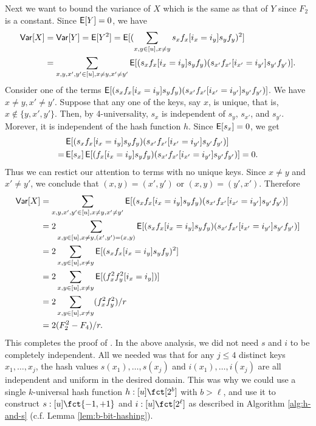 Next we want to bound the variance of $X$ which is the same as
that of $Y$ since $F_2$ is a constant. Since
$\operatorname*{\sf{E}}[Y]=0$, we have
\begin{align*}
{\sf Var}[X]&={\sf Var}[Y]=\operatorname*{\sf{E}}[Y^2]=\operatorname*{\sf{E}}[(\sum_{x,y\in[u],x\neq y}s_x f_x[i_x=i_y]s_y f_y)^2]\\
&=\sum_{x,y,x',y'\in[u],x\neq y,x'\neq y'}\operatorname*{\sf{E}}[(s_x f_x[i_x=i_y]s_y f_y)
(s_{x'}f_{x'}[i_{x'}=i_{y'}]s_{y'} f_{y'})].
\end{align*}
Consider one of the terms $\operatorname*{\sf{E}}[(s_x f_x[i_x=i_y]s_y f_y)
(s_{x'}f_{x'}[i_{x'}=i_{y'}]s_{y'} f_{y'})]$. We have $x\neq y,x'\neq y'$. 
Suppose that any one of the keys,
say $x$, is unique, that is, $x\not\in\{y,x',y'\}$. Then, by
4-universality, $s_x$ is independent of $s_y$, $s_{x'}$, and $s_{y'}$.
Morever, it is independent of the hash function $h$. Since $\operatorname*{\sf{E}}[s_x]=0$,
we get
\begin{align*}
&\operatorname*{\sf{E}}[(s_x f_x[i_x=i_y]s_y f_y)
(s_{x'}f_{x'}[i_{x'}=i_{y'}]s_{y'} f_{y'})] \\
=&\operatorname*{\sf{E}}[s_x]\operatorname*{\sf{E}}[(f_x[i_x=i_y]s_y f_y) 
(s_{x'}f_{x'}[i_{x'}=i_{y'}]s_{y'} f_{y'})]=0.
\end{align*}
Thus we can restict our attention to terms with no unique keys. 
Since $x\neq y$ and $x'\neq y'$, we conclude that 
$(x,y)=(x',y')$ or $(x,y)=(y',x')$. Therefore
\begin{align*}
{\sf Var}[X]&=\sum_{x,y,x',y'\in[u],x\neq y,x'\neq y'}\operatorname*{\sf{E}}[(s_x f_x[i_x=i_y]s_y f_y)
(s_{x'}f_{x'}[i_{x'}=i_{y'}]s_{y'} f_{y'})]\\
       &=2\sum_{x,y\in[u],x\neq y,(x',y')=(x,y)}\operatorname*{\sf{E}}[(s_x f_x[i_x=i_y]s_y f_y)
(s_{x'}f_{x'}[i_{x'}=i_{y'}]s_{y'} f_{y'})]\\
&=2\sum_{x,y\in[u],x\neq y}\operatorname*{\sf{E}}[(s_x f_x[i_x=i_y]s_y f_y)^2]\\
&=2\sum_{x,y\in[u],x\neq y}\operatorname*{\sf{E}}[(f_x^2f_y^2[i_x=i_y])]\\
&=2\sum_{x,y\in[u],x\neq y}(f_x^2f_y^2)/r\\
&=2(F_2^2-F_4)/r.
\end{align*}
This completes the proof of . In the above analysis, we
did not need $s$ and $i$ to be completely independent. All we needed
was that for any $j\leq 4$ distinct keys $x_1,\ldots,x_j$, the hash
values $s(x_1),\ldots,s(x_j)$ and $i(x_1),\ldots,i(x_j)$ are all
independent and uniform in the desired domain. This was why we could
use a single $k$-universal hash function $h:[u]\fct[2^b]$ with
$b>\ell$, and use it to construct $s:[u]\fct\{-1,+1\}$ and
$i:[u]\fct[2^\ell]$ as described in Algorithm \ref{alg:h-and-s}
(c.f. Lemma \ref{lem:b-bit-hashing}).




